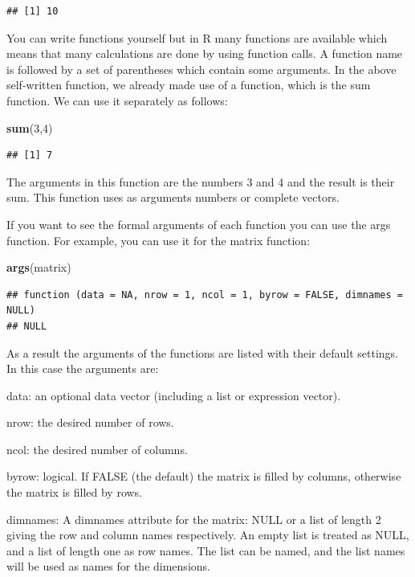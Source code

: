 \documentclass[]{book}
\newenvironment{Shaded}{\begin{snugshade}}{\end{snugshade}}
\newcommand{\KeywordTok}[1]{\textcolor[rgb]{0.13,0.29,0.53}{\textbf{#1}}}
\newcommand{\DecValTok}[1]{\textcolor[rgb]{0.00,0.00,0.81}{#1}}
\newcommand{\NormalTok}[1]{#1}
\begin{document}
\begin{verbatim}
## [1] 10
\end{verbatim}

You can write functions yourself but in R many functions are available
which means that many calculations are done by using function calls. A
function name is followed by a set of parentheses which contain some
arguments. In the above self-written function, we already made use of a
function, which is the sum function. We can use it separately as
follows:

\begin{Shaded}
\begin{Highlighting}[]
\KeywordTok{sum}\NormalTok{(}\DecValTok{3}\NormalTok{,}\DecValTok{4}\NormalTok{)}
\end{Highlighting}
\end{Shaded}

\begin{verbatim}
## [1] 7
\end{verbatim}

The arguments in this function are the numbers 3 and 4 and the result is
their sum. This function uses as arguments numbers or complete vectors.

If you want to see the formal arguments of each function you can use the
args function. For example, you can use it for the matrix function:

\begin{Shaded}
\begin{Highlighting}[]
\KeywordTok{args}\NormalTok{(matrix)}
\end{Highlighting}
\end{Shaded}

\begin{verbatim}
## function (data = NA, nrow = 1, ncol = 1, byrow = FALSE, dimnames = NULL) 
## NULL
\end{verbatim}

As a result the arguments of the functions are listed with their default
settings. In this case the arguments are:

data: an optional data vector (including a list or expression vector).

nrow: the desired number of rows.

ncol: the desired number of columns.

byrow: logical. If FALSE (the default) the matrix is filled by columns,
otherwise the matrix is filled by rows.

dimnames: A dimnames attribute for the matrix: NULL or a list of length
2 giving the row and column names respectively. An empty list is treated
as NULL, and a list of length one as row names. The list can be named,
and the list names will be used as names for the dimensions.
\end{document}
